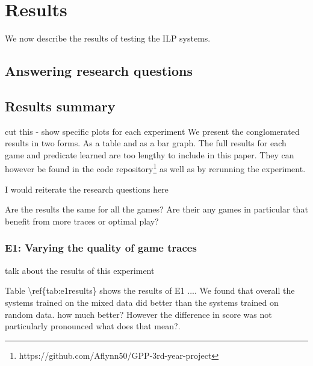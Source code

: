 \chapter{Results}\label{ch:results}
We now describe the results of testing the ILP systems. 








\section{Answering research questions}


\section{Results summary}


\ac{cut this - show specific plots for each experiment}
We present the conglomerated results in two forms. As a table and as a bar graph. The full results for each game and predicate learned are too lengthy to include in this paper. They can however be found in the code repository\footnote{https://github.com/Aflynn50/GPP-3rd-year-project} as well as by rerunning the experiment.


 \ac{I would reiterate the research questions here}

\ac{
	Are the results the same for all the games?
	Are their any games in particular that benefit from more traces or optimal play?
}

\subsection{E1: Varying the quality of game traces}
\ac{talk about the results of this experiment}



\ac{Table \ref{tab:e1results} shows the results of E1 ....}
We found that overall the systems trained on the mixed data did better than the systems trained on random data.
\ac{how much better?}
However the difference in score was not particularly pronounced \ac{what does that mean?}.

